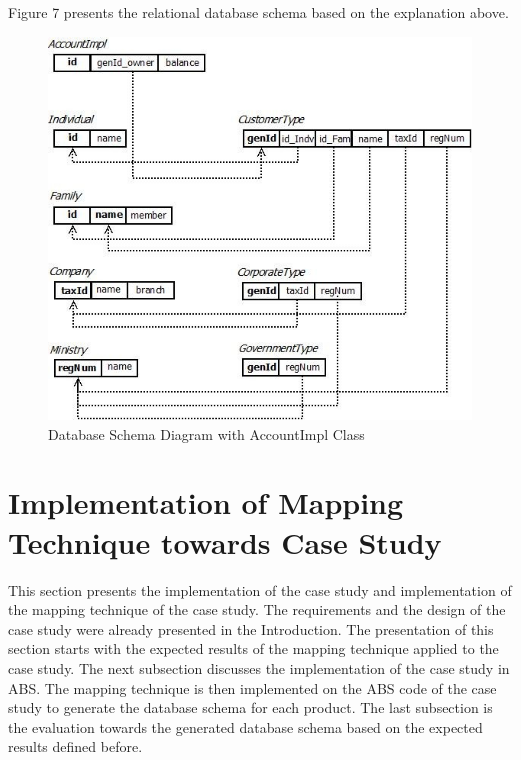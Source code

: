 \documentclass[runningheads,a4paper]{llncs}
\begin{document}
Figure 7 presents the relational database schema based on the explanation above.

\begin{figure}
	\centering
	\includegraphics[scale=0.7]{db2.jpg}
	\caption{Database Schema Diagram with AccountImpl Class}
	\label{sample}
\end{figure}


\section{Implementation of Mapping Technique towards Case Study}
This section presents the implementation of the case study and implementation of the mapping technique of the case study. The requirements and the design of the case study were already presented in the Introduction. The presentation of this section starts with the expected results of the mapping technique applied to the case study. The next subsection discusses the implementation of the case study in ABS. The mapping technique is then implemented on the ABS code of the case study to generate the database schema for each product. The last subsection is the evaluation towards the generated database schema based on the expected results defined before.
\end{document}
